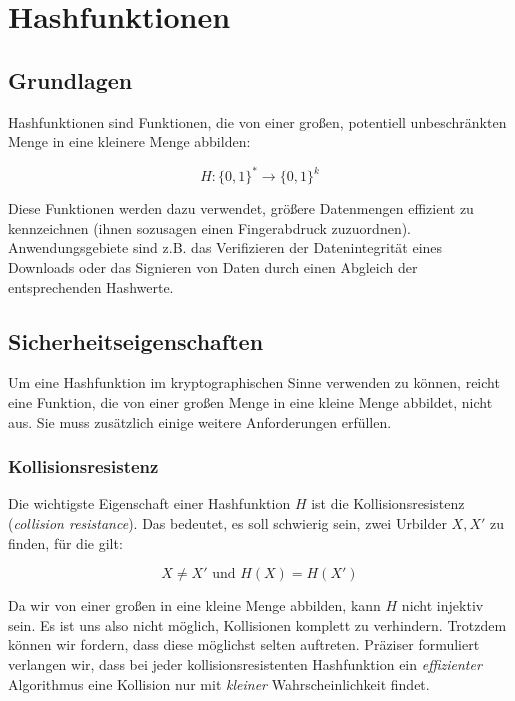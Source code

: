 \chapter{Hashfunktionen}

\section{Grundlagen}

Hashfunktionen sind Funktionen, die von einer großen, potentiell unbeschränkten Menge in eine kleinere Menge abbilden:

\begin{equation*}
H \colon \{0,1\}^* \rightarrow \{0,1\}^k
\end{equation*}

Diese Funktionen werden dazu verwendet, größere Datenmengen effizient zu kennzeichnen (ihnen sozusagen einen Fingerabdruck zuzuordnen). Anwendungsgebiete sind
z.B. das Verifizieren der Datenintegrität eines Downloads oder das Signieren von Daten durch einen Abgleich der entsprechenden Hashwerte.

\section{Sicherheitseigenschaften}

Um eine Hashfunktion im kryptographischen Sinne verwenden zu können, reicht eine Funktion, die von einer großen Menge in eine kleine Menge abbildet, nicht aus.
Sie muss zusätzlich einige weitere Anforderungen erfüllen.

\subsection{Kollisionsresistenz}
Die wichtigste Eigenschaft einer Hashfunktion $H$ ist die Kollisionsresistenz (\textit{collision resistance}). Das bedeutet, es soll schwierig sein, zwei
Urbilder $X, X'$ zu finden, für die gilt: 

\begin{equation*}
X \neq X' \text{ und } H(X) = H(X')
\end{equation*}

Da wir von einer großen in eine kleine Menge abbilden, kann $H$ nicht injektiv sein. Es ist uns also nicht möglich, Kollisionen komplett zu verhindern. Trotzdem
können wir fordern, dass diese möglichst selten auftreten. Präziser formuliert verlangen wir, dass bei jeder kollisionsresistenten Hashfunktion ein \emph{effizienter}
Algorithmus eine Kollision nur mit \emph{kleiner} Wahrscheinlichkeit findet.

